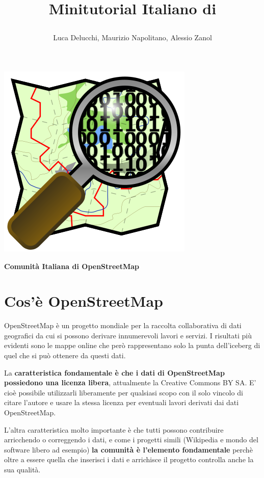 \documentclass[a4paper,twoside,12pt,]{article}
\title{\begin{Large}Minitutorial Italiano di \osm\end{Large}}
\author{Luca Delucchi, Maurizio Napolitano, Alessio Zanol}
\newcommand{\osm}{OpenStreetMap\xspace}
\begin{document}
\maketitle
\begin{center}
\includegraphics{Openstreetmap.png}
\end{center}
\begin{center}
	\begin{large}
	\textbf{Comunità Italiana di OpenStreetMap}
	\end{large}
\end{center}
\newpage

\section{Cos'è \osm}
\osm è un progetto mondiale per la raccolta collaborativa di dati geografici da cui si possono derivare innumerevoli lavori e servizi. I risultati più evidenti sono le mappe online che però rappresentano solo la punta dell'iceberg di quel che si può ottenere da questi dati.

La \textbf{caratteristica fondamentale è che i dati di \osm possiedono una licenza libera}, attualmente la Creative Commons BY SA. E' cioè possibile utilizzarli liberamente per qualsiasi scopo con il solo vincolo di citare l'autore e usare la stessa licenza per eventuali lavori derivati dai dati \osm. 

L'altra caratteristica molto importante è che tutti possono contribuire arricchendo o correggendo i dati, e come i progetti simili (Wikipedia e mondo del software libero ad esempio) \textbf{la comunità è l'elemento fondamentale} perchè oltre a essere quella che inserisci i dati e arrichisce il progetto controlla anche la sua qualità.
\end{document}

